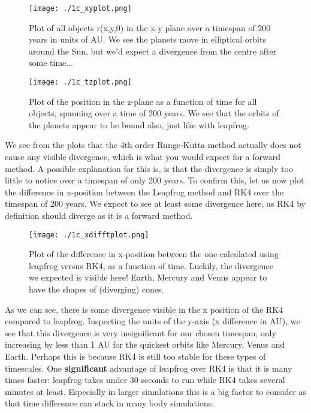 \begin{figure}[h!]
  \centering
  \texttt{[image: ./1c\_xyplot.png]}
  \caption{Plot of all objects r(x,y,0) in the x-y plane over a timespan of 200 years in units of AU. We see the planets move in elliptical orbits around the Sun, but we'd expect a divergence from the centre after some time...}
\end{figure}

\begin{figure}[h!]
  \centering
  \texttt{[image: ./1c\_tzplot.png]}
  \caption{Plot of the position in the z-plane as a function of time for all objects, spanning over a time of 200 years. We see that the orbits of the planets appear to be bound also, just like with leapfrog.}
\end{figure}

\clearpage

We see from the plots that the 4th order Runge-Kutta method actually does not cause any visible divergence, which is what you would expect for a forward method. A possible explanation for this is, is that the divergence is simply too little to notice over a timespan of only 200 years. To confirm this, let us now plot the difference in x-position between the Leapfrog method and RK4 over the timespan of 200 years. We expect to see at least some divergence here, as RK4 by definition should diverge as it is a forward method. 

\begin{figure}[h!]
  \centering
  \texttt{[image: ./1c\_xdifftplot.png]}
  \caption{Plot of the difference in x-position between the one calculated using leapfrog versus RK4, as a function of time. Luckily, the divergence we expected is visible here! Earth, Mercury and Venus appear to have the shapes of (diverging) cones.}
\end{figure}

As we can see, there is some divergence visible in the x position of the RK4 compared to leapfrog. Inspecting the units of the y-axis (x difference in AU), we see that this divergence is very insignificant for our chosen timespan, only increasing by less than 1 AU for the quickest orbits like Mercury, Venus and Earth. Perhaps this is because RK4 is still too stable for these types of timescales. One \textbf{significant} advantage of leapfrog over RK4 is that it is many times faster: leapfrog takes under 30 seconds to run while RK4 takes several minutes at least. Especially in larger simulations this is a big factor to consider as that time difference can stack in many body simulations. 















